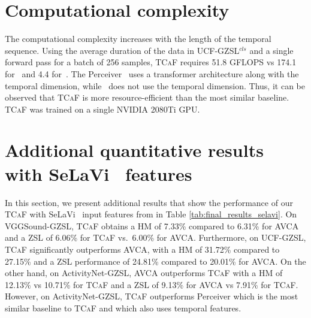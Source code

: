 \documentclass[runningheads]{llncs}
\newcommand{\modelName}{\textsc{TCaF}\xspace}
\newcommand{\ucf}{{UCF-GZSL$^{cls}$}\xspace}
\newcommand{\selaactivity}{{ActivityNet-GZSL}\xspace}
\newcommand{\selaucf}{{UCF-GZSL}\xspace}
\newcommand{\selavgg}{{VGGSound-GZSL}\xspace}
\begin{document}
\section{Computational complexity}
\label{section:computational_complexity}
The computational complexity increases with the length
of the temporal sequence. Using the average duration of the data in \ucf and
a single forward pass for a batch of 256 samples, \modelName
requires 51.8 GFLOPS vs 174.1 for~\cite{jaegle2021perceiver} and 4.4 for~\cite{mercea2022}. The Perceiver~\cite{jaegle2021perceiver} uses a transformer architecture along with the temporal dimension, while~\cite{mercea2022} does not use the temporal dimension. Thus, it can be observed that \modelName is more resource-efficient than the most similar baseline.
\modelName was trained on a single NVIDIA 2080Ti GPU.




\section{Additional quantitative results with SeLaVi~\cite{asano2020labelling} features}
\label{section:selavi_results}
In this section, we present additional results that show the performance of our \modelName with SeLaVi~\cite{asano2020labelling} input features from \cite{mercea2022} in Table \ref{tab:final_results_selavi}. On \selavgg, \modelName obtains a HM of 7.33\% compared to 6.31\% for AVCA and a ZSL of 6.06\% for \modelName vs.\ 6.00\% for AVCA. Furthermore, on \selaucf, \modelName significantly outperforms AVCA, with a HM of 31.72\% compared to 27.15\% and a ZSL performance of 24.81\% compared to 20.01\% for AVCA. On the other hand, on \selaactivity, AVCA outperforms \modelName with a HM of 12.13\% vs 10.71\% for \modelName and a ZSL of 9.13\% for AVCA vs 7.91\% for \modelName. However, on \selaactivity, \modelName outperforms Perceiver which is the most similar baseline to \modelName and which also uses temporal features. 
\end{document}
